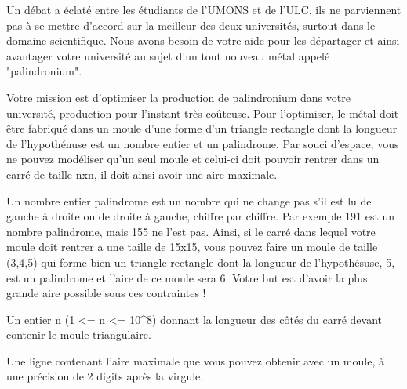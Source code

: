 \problemname{\problemyamlname}

Un débat a éclaté entre les étudiants de l'UMONS et de l'ULC, ils ne parviennent pas à se mettre d'accord sur la meilleur des deux universités, surtout dans le domaine scientifique. Nous avons besoin de votre aide pour les départager et ainsi avantager votre université au sujet d'un tout nouveau métal appelé "palindronium".

Votre mission est d'optimiser la production de palindronium dans votre université, production pour l'instant très coûteuse. Pour l'optimiser, le métal doit être fabriqué dans un moule d'une forme d'un triangle rectangle dont la longueur de l'hypothénuse est un nombre entier et un palindrome. Par souci d'espace, vous ne pouvez modéliser qu'un seul moule et celui-ci doit pouvoir rentrer dans un carré de taille nxn, il doit ainsi avoir une aire maximale.

Un nombre entier palindrome est un nombre qui ne change pas s'il est lu de gauche à droite ou de droite à gauche, chiffre par chiffre. Par exemple 191 est un nombre palindrome, mais 155 ne l'est pas. Ainsi, si le carré dans lequel votre moule doit rentrer a une taille de 15x15, vous pouvez faire un moule de taille (3,4,5) qui forme bien un triangle rectangle dont la longueur de l'hypothésuse, 5, est un palindrome et l'aire de ce moule sera 6. Votre but est d'avoir la plus grande aire possible sous ces contraintes !

\begin{Input}
    Un entier n (1 <= n <= 10^8) donnant la longueur des côtés du carré devant contenir le moule triangulaire.
\end{Input}

\begin{Output}
    Une ligne contenant l'aire maximale que vous pouvez obtenir avec un moule, à une précision de 2 digits après la virgule.
\end{Output}
